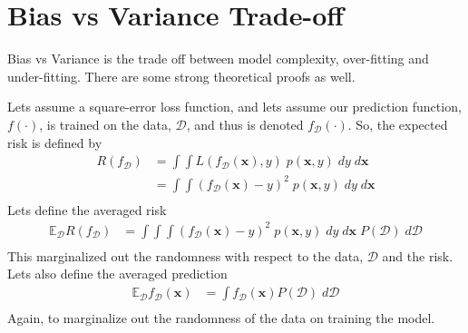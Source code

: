 \documentclass[11pt]{article}
\newcommand{\vct}[1]{\boldsymbol{#1}} %
\newcommand{\ProbOpr}[1]{\mathbb{#1}}
\begin{document}
\section{Bias vs Variance Trade-off} \label{sec:bias-variance}
Bias vs Variance is the trade off between model complexity, over-fitting and under-fitting. There are some strong theoretical proofs as well.

Lets assume a square-error loss function, and lets assume our prediction function, $f(\cdot)$, is trained on the data, $\mathcal{D}$, and thus is denoted $f_{\mathcal{D}}(\cdot)$. So, the expected risk is defined by
\begin{align*}
R(f_{\mathcal{D}}) &= \int \int L(f_{\mathcal{D}}(\vct{x}),y) \;p(\vct{x},y) \;dy \;d\vct{x}\\
&=  \int \int (f_{\mathcal{D}}(\vct{x})-y)^2 \;p(\vct{x},y) \;dy \;d\vct{x}\\
\end{align*}
Lets define the averaged risk
\begin{align*}
\ProbOpr{E}_{\mathcal{D}} R(f_{\mathcal{D}}) &=  \int \int \int (f_{\mathcal{D}}(\vct{x})-y)^2 \;p(\vct{x},y) \;dy \;d\vct{x}\; P(\mathcal{D})\;d\mathcal{D}\\
\end{align*}
This marginalized out the randomness with respect to the data, $\mathcal{D}$ and the risk. Lets also define the averaged prediction
\begin{align*}
\ProbOpr{E}_{\mathcal{D}} f_{\mathcal{D}}(\vct{x}) &=  \int  f_{\mathcal{D}}(\vct{x}) P(\mathcal{D})\;d\mathcal{D}\\
\end{align*}
Again, to marginalize out the randomness of the data on training the model.
\end{document}

